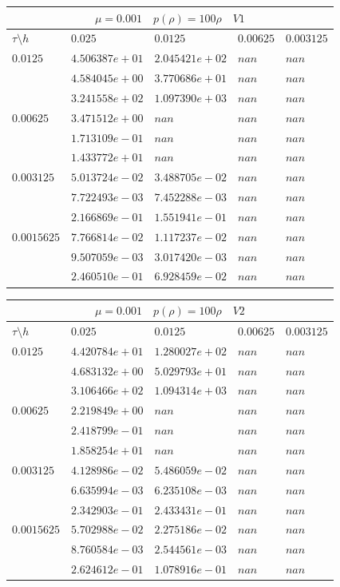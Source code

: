 \documentclass[a4paper,12pt]{extarticle}
\begin{document}
\begin{tabular}{|l|l|l|l|l|}
	\hline
	\multicolumn{5}{|c|}{$\mu =0.001 \quad  p(\rho) =100 \rho \quad V1$}\\
	\hline
	$\tau\setminus h$ & $0.025$ & $0.0125$ & $0.00625$ & $0.003125$\\
	\hline
	$0.0125$  & $4.506387e+01$ & $2.045421e+02$ & $nan$ & $nan$\\
	& $4.584045e+00$ & $3.770686e+01$ & $nan$ & $nan$\\
	& $3.241558e+02$ & $1.097390e+03$ & $nan$ & $nan$\\
	\hline
	$0.00625$  & $3.471512e+00$ & $nan$ & $nan$ & $nan$\\
	& $1.713109e-01$ & $nan$ & $nan$ & $nan$\\
	& $1.433772e+01$ & $nan$ & $nan$ & $nan$\\
	\hline
	$0.003125$  & $5.013724e-02$ & $3.488705e-02$ & $nan$ & $nan$\\
	& $7.722493e-03$ & $7.452288e-03$ & $nan$ & $nan$\\
	& $2.166869e-01$ & $1.551941e-01$ & $nan$ & $nan$\\
	\hline
	$0.0015625$  & $7.766814e-02$ & $1.117237e-02$ & $nan$ & $nan$\\
	& $9.507059e-03$ & $3.017420e-03$ & $nan$ & $nan$\\
	& $2.460510e-01$ & $6.928459e-02$ & $nan$ & $nan$\\
	\hline
\end{tabular}

\begin{tabular}{|l|l|l|l|l|}
	\hline
	\multicolumn{5}{|c|}{$\mu =0.001 \quad  p(\rho) =100 \rho \quad V2$}\\
	\hline
	$\tau\setminus h$ & $0.025$ & $0.0125$ & $0.00625$ & $0.003125$\\
	\hline
	$0.0125$  & $4.420784e+01$ & $1.280027e+02$ & $nan$ & $nan$\\
	& $4.683132e+00$ & $5.029793e+01$ & $nan$ & $nan$\\
	& $3.106466e+02$ & $1.094314e+03$ & $nan$ & $nan$\\
	\hline
	$0.00625$  & $2.219849e+00$ & $nan$ & $nan$ & $nan$\\
	& $2.418799e-01$ & $nan$ & $nan$ & $nan$\\
	& $1.858254e+01$ & $nan$ & $nan$ & $nan$\\
	\hline
	$0.003125$  & $4.128986e-02$ & $5.486059e-02$ & $nan$ & $nan$\\
	& $6.635994e-03$ & $6.235108e-03$ & $nan$ & $nan$\\
	& $2.342903e-01$ & $2.433431e-01$ & $nan$ & $nan$\\
	\hline
	$0.0015625$  & $5.702988e-02$ & $2.275186e-02$ & $nan$ & $nan$\\
	& $8.760584e-03$ & $2.544561e-03$ & $nan$ & $nan$\\
	& $2.624612e-01$ & $1.078916e-01$ & $nan$ & $nan$\\
	\hline
\end{tabular}
\end{document}

